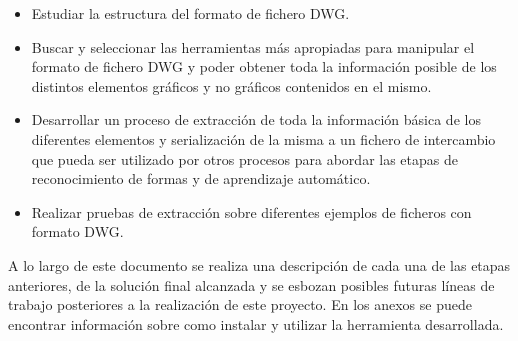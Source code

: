 \begin{itemize}

\item{Estudiar la estructura del formato de fichero DWG.}
\item{Buscar y seleccionar las herramientas más apropiadas para manipular el formato de fichero DWG y poder obtener toda la información posible de los distintos elementos gráficos y no gráficos contenidos en el mismo.}
\item{Desarrollar un proceso de extracción de toda la información básica de los diferentes elementos y serialización de la misma a un fichero de intercambio que pueda ser utilizado por otros procesos para abordar las etapas de reconocimiento de formas y de aprendizaje automático.}
\item{Realizar pruebas de extracción sobre diferentes ejemplos de ficheros con formato DWG.}

\end{itemize}

A lo largo de este documento se realiza una descripción de cada una de las etapas anteriores, de la solución final alcanzada y se esbozan posibles futuras líneas de trabajo posteriores a la realización de este proyecto. En los anexos se puede encontrar información sobre como instalar y utilizar la herramienta desarrollada.
